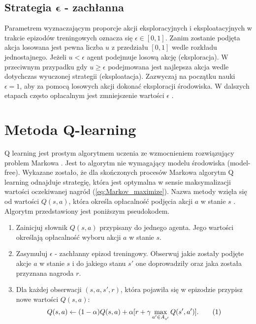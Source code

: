 \documentclass[12pt]{book}
\theoremstyle{plain}
\newcommand\addtag{\refstepcounter{equation}
\renewcommand{\labelenumii}{\theenumii}
\renewcommand{\theenumii}{\theenumi.\arabic{enumii}.}
\tag{\theequation}}
\newcommand{\myref}[1]{(\ref{#1})}
\begin{document}
\subsection*{Strategia $\mathbf{\epsilon}$ - zachłanna}
Parametrem wyznaczającym proporcje akcji eksploracyjnych i eksploatacyjnych w trakcie epizodów treningowych oznacza się $\epsilon \in [0,1]$. Zanim zostanie podjęta akcja losowana jest pewna liczba $u$ z przedziału $[0,1]$ wedle rozkładu jednostajnego. Jeżeli $u<\epsilon$ agent podejmuje losową akcję (eksploracja). W przeciwnym przypadku gdy $u \geq \epsilon$ podejmowana jest najlepsza akcja wedle dotychczas wyuczonej strategii (eksploatacja). Zazwyczaj na początku nauki $\epsilon=1$, aby za pomocą losowych akcji dokonać eksploracji środowiska. W dalszych etapach często opłacalnym jest zmniejszenie wartości $\epsilon$ \cite{epsilon_decay}.

\section{Metoda Q-learning}
Q learning jest prostym algorytmem uczenia ze wzmocnieniem rozwiązujący problem Markowa \cite{watkins}. Jest to algorytm nie wymagający modelu środowiska (model-free). Wykazane zostało\cite{q_zbieznosc}, że dla skończonych procesów Markowa algorytm Q learning odnajduje strategię, która jest optymalna w sensie maksymalizacji wartości oczekiwanej nagród \myref{eq:Markov_maximize}. Nazwa metody wzięła się od wartości $Q(s,a)$, która określa opłacalność podjęcia akcji $a$ w stanie $s$ \cite{nazwa_q}. Algorytm przedstawiony jest poniższym pseudokodem.
\begin{enumerate}
	\item Zainicjuj słownik
	$Q(s,a)$ przypisany do jednego agenta. Jego wartości określają opłacalność wyboru akcji $a$ w stanie $s$.
	\item Zasymuluj $\epsilon$ - zachłanny epizod treningowy. Obserwuj jakie zostały podjęte akcje $a$ w stanie $s$ i do jakiego stanu $s'$ one doprowadziły oraz jaka została przyznana nagroda $r$.
	\item Dla każdej obserwacji $(s,a,s',r)$, która pojawiła się w epizodzie przypisz nowe wartości $Q(s,a)$:
	\[Q(s,a) \leftarrow (1-\alpha)Q(s,a) + \alpha [r + \gamma \max_{a' \in A_{s'}} Q(s',a')]. \addtag \label{eq:q_rozwoj} \]
\end{enumerate}
\end{document}
